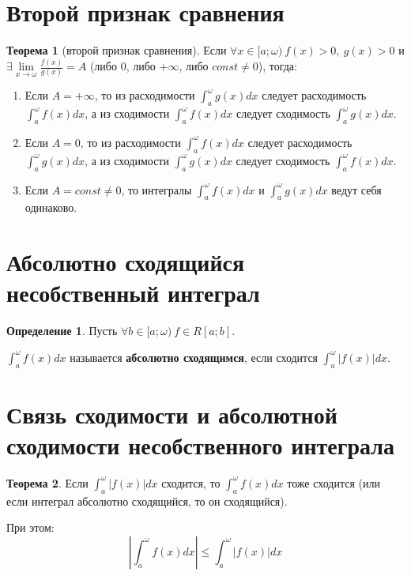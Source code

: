 \documentclass{report}
\theoremstyle{definition}
\newtheorem*{definition}{Определение}
\newtheorem*{theorem}{Теорема}
\begin{document}
\section{Второй признак сравнения}

\begin{theorem}[второй признак сравнения]
    Если $\forall x \in [a;\omega) \ f(x) > 0, \ g(x) > 0$ и $\exists \underset{x\rightarrow \omega}{\lim}
        \frac{f(x)}{g(x)} = A$ (либо $0$, либо $+\infty$, либо $const \ne 0$), тогда:
    \begin{enumerate}
        \item Если $A = +\infty$, то из расходимости $\int_{a}^{\omega}g(x)dx$ следует расходимость $\int_{a}^{\omega}
                  f(x)dx$, а из сходимости $\int_{a}^{\omega}f(x)dx$ следует сходимость $\int_{a}^{\omega}g(x)dx$.
        \item Если $A = 0$, то из расходимости $\int_{a}^{\omega}f(x)dx$ следует расходимость $\int_{a}^{\omega}
                  g(x)dx$, а из сходимости $\int_{a}^{\omega}g(x)dx$ следует сходимость $\int_{a}^{\omega}f(x)dx$.
        \item Если $A = const \ne 0$, то интегралы $\int_{a}^{\omega}f(x)dx$ и $\int_{a}^{\omega}g(x)dx$ ведут
              себя одинаково.
    \end{enumerate}
\end{theorem}

\section{Абсолютно сходящийся несобственный интеграл}

\begin{definition}
    Пусть $\forall b \in [a;\omega) \ f\in R[a;b]$.

    $\int_{a}^{\omega}f(x)dx$ называется \textbf{абсолютно сходящимся}, если сходится $\int_{a}^{\omega}|f(x)|dx$.
\end{definition}

\section{Связь сходимости и абсолютной сходимости несобственного интеграла}

\begin{theorem}
    Если $\int_{a}^{\omega}| f(x) |dx$ сходится, то $\int_{a}^{\omega}f(x)dx$ тоже сходится (или если интеграл
    абсолютно сходящийся, то он сходящийся).

    При этом:
    \begin{equation*}
        | \int_{a}^{\omega}f(x)dx | \leqslant \int_{a}^{\omega}| f(x) |dx
    \end{equation*}
\end{theorem}
\end{document}
